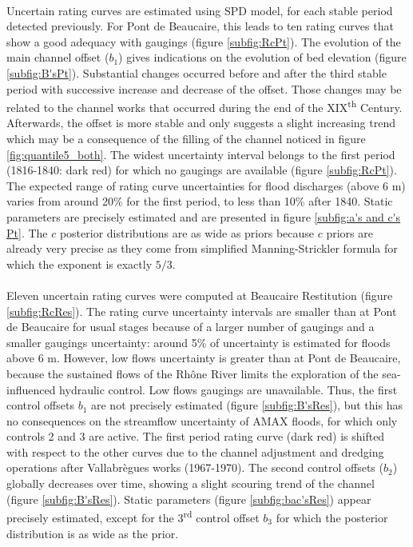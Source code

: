 \documentclass[11pt]{article}
\begin{document}
    \paragraph{}
    Uncertain rating curves are estimated using \citet{mansanarez_shift_2019} SPD model, for each stable period detected previously. For Pont de Beaucaire, this leads to ten rating curves that show a good adequacy with gaugings (figure \ref{subfig:RcPt}). The evolution of the main channel offset ($b_1$) gives indications on the evolution of bed elevation (figure \ref{subfig:B'sPt}). Substantial changes occurred before and after the third stable period with successive increase and decrease of the offset. Those changes may be related to the channel works that occurred during the end of the XIX\textsuperscript{th} Century. Afterwards, the offset is more stable and only suggests a slight increasing trend which may be a consequence of the filling of the channel noticed in figure \ref{fig:quantile5_both}. The widest uncertainty interval belongs to the first period (1816-1840: dark red) for which no gaugings are available (figure \ref{subfig:RcPt}). The expected range of rating curve uncertainties for flood discharges (above 6 m) varies from around 20\% for the first period, to less than 10\% after 1840. Static parameters are precisely estimated and are presented in figure \ref{subfig:a's and c's Pt}. The $c$ posterior distributions are as wide as priors because $c$ priors are already very precise as they come from simplified Manning-Strickler formula for which the exponent is exactly $5/3$.
    
    \paragraph{}
    Eleven uncertain rating curves were computed at Beaucaire Restitution (figure \ref{subfig:RcRes}). The rating curve uncertainty intervals are smaller than at Pont de Beaucaire for usual stages because of a larger number of gaugings and a smaller gaugings uncertainty: around 5\% of uncertainty is estimated for floods above 6 m. However, low flows uncertainty is greater than at Pont de Beaucaire, because the sustained flows of the Rhône River limits the exploration of the sea-influenced hydraulic control. Low flows gaugings are unavailable. Thus, the first control offsets $b_1$ are not precisely estimated (figure \ref{subfig:B'sRes}), but this has no consequences on the streamflow uncertainty of AMAX floods, for which only controls 2 and 3 are active. The first period rating curve (dark red) is shifted with respect to the other curves due to the channel adjustment and dredging operations after Vallabrègues works (1967-1970). The second control offsets ($b_2$) globally decreases over time, showing a slight scouring trend of the channel (figure \ref{subfig:B'sRes}). Static parameters (figure \ref{subfig:bac'sRes}) appear precisely estimated, except for the 3\textsuperscript{rd} control offset $b_3$ for which the posterior distribution is as wide as the prior. 
    
\end{document}
